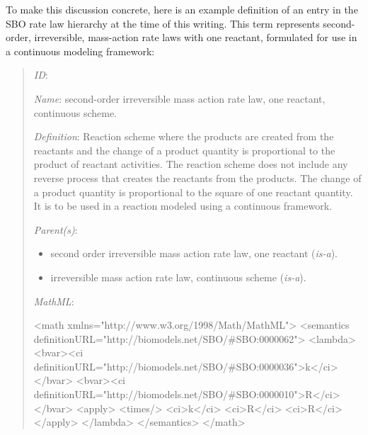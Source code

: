 To make this discussion concrete, here is an example definition of
an entry in the SBO rate law hierarchy at the time of this
writing.  This term represents second-order, irreversible,
mass-action rate laws with one reactant, formulated for use in a
continuous modeling framework:
\begin{quote}
\begin{description}

\item \emph{ID}: 

\item \emph{Name}: second-order irreversible mass action rate law,
  one reactant, continuous scheme.

\item \emph{Definition}: Reaction scheme where the products are
  created from the reactants and the change of a product quantity
  is proportional to the product of reactant activities. The
  reaction scheme does not include any reverse process that
  creates the reactants from the products. The change of a product
  quantity is proportional to the square of one reactant quantity.
  It is to be used in a reaction modeled using a continuous
  framework.

\item \emph{Parent(s)}: 
  \begin{itemize}

  \item {} second order irreversible mass action
    rate law, one reactant (\emph{is-a}).

  \item {} irreversible mass action rate law,
    continuous scheme (\emph{is-a}).
  \end{itemize}
  
\item \emph{MathML}:
\begin{example}
<math xmlns="http://www.w3.org/1998/Math/MathML">
   <semantics definitionURL="http://biomodels.net/SBO/#SBO:0000062">
      <lambda>
         <bvar><ci definitionURL="http://biomodels.net/SBO/#SBO:0000036">k</ci></bvar>
         <bvar><ci definitionURL="http://biomodels.net/SBO/#SBO:0000010">R</ci></bvar>
         <apply>
            <times/>
            <ci>k</ci>
            <ci>R</ci>
            <ci>R</ci>
         </apply>
      </lambda>
   </semantics>
</math>
\end{example}

\end{description}
\end{quote}

